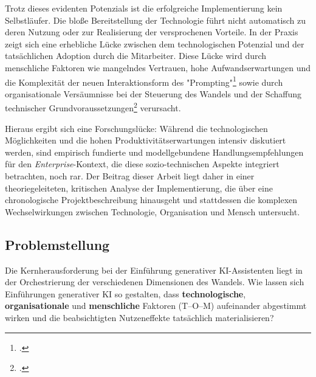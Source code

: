 \documentclass[12pt,a4paper,oneside]{article} %
\begin{document}
Trotz dieses evidenten Potenzials ist die erfolgreiche Implementierung kein Selbstläufer. Die bloße Bereitstellung der Technologie führt nicht automatisch zu deren Nutzung oder zur Realisierung der versprochenen Vorteile. In der Praxis zeigt sich eine erhebliche Lücke zwischen dem technologischen Potenzial und der tatsächlichen Adoption durch die Mitarbeiter. Diese Lücke wird durch menschliche Faktoren wie mangelndes Vertrauen, hohe Aufwandserwartungen und die Komplexität der neuen Interaktionsform des "Prompting"\footcite{Arxiv2025BeyondTraining} sowie durch organisationale Versäumnisse bei der Steuerung des Wandels und der Schaffung technischer Grundvoraussetzungen\footcite{MicrosoftLearn2025CopilotSecurity} verursacht.

Hieraus ergibt sich eine Forschungslücke: Während die technologischen Möglichkeiten und die hohen Produktivitätserwartungen intensiv diskutiert werden, sind empirisch fundierte und modellgebundene Handlungsempfehlungen für den \textit{Enterprise}-Kontext, die diese sozio-technischen Aspekte integriert betrachten, noch rar. Der Beitrag dieser Arbeit liegt daher in einer theoriegeleiteten, kritischen Analyse der Implementierung, die über eine chronologische Projektbeschreibung hinausgeht und stattdessen die komplexen Wechselwirkungen zwischen Technologie, Organisation und Mensch untersucht.

\subsection{Problemstellung}
Die Kernherausforderung bei der Einführung generativer KI-Assistenten liegt in der Orchestrierung der verschiedenen Dimensionen des Wandels. Wie lassen sich Einführungen generativer KI so gestalten, dass \textbf{technologische}, \textbf{organisationale} und \textbf{menschliche} Faktoren (T–O–M) aufeinander abgestimmt wirken und die beabsichtigten Nutzeneffekte tatsächlich materialisieren?
\end{document}
